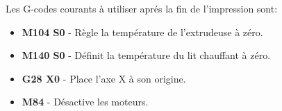 Les G-codes courants \`a utiliser apr\'es la fin de l'impression sont:
\begin{itemize}
	\item \textbf{M104 S0}  - R\`egle la temp\'erature de l'extrudeuse \`a z\'ero.
	\item \textbf{M140 S0} - D\'efinit la temp\'erature du lit chauffant \`a z\'ero.
	\item \textbf{G28 X0} - Place l'axe X \`a son origine.
	\item \textbf{M84}  - D\'esactive les moteurs.
\end{itemize}

